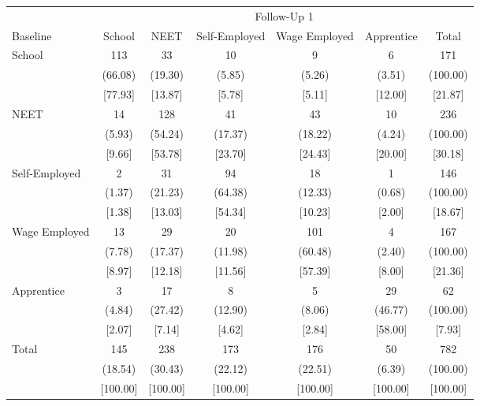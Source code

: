 {
\def\sym#1{\ifmmode^{#1}\else\(^{#1}\)\fi}
\begin{tabular}{l*{6}{c}}
\hline\hline
            &\multicolumn{6}{c}{Follow-Up 1}                                              \\
Baseline    &      School&        NEET&Self-Employed&Wage Employed&  Apprentice&       Total\\
\hline
School      &         113&          33&          10&           9&           6&         171\\
            &     (66.08)&     (19.30)&      (5.85)&      (5.26)&      (3.51)&    (100.00)\\
            &     [77.93]&     [13.87]&      [5.78]&      [5.11]&     [12.00]&     [21.87]\\
NEET        &          14&         128&          41&          43&          10&         236\\
            &      (5.93)&     (54.24)&     (17.37)&     (18.22)&      (4.24)&    (100.00)\\
            &      [9.66]&     [53.78]&     [23.70]&     [24.43]&     [20.00]&     [30.18]\\
Self-Employed&           2&          31&          94&          18&           1&         146\\
            &      (1.37)&     (21.23)&     (64.38)&     (12.33)&      (0.68)&    (100.00)\\
            &      [1.38]&     [13.03]&     [54.34]&     [10.23]&      [2.00]&     [18.67]\\
Wage Employed&          13&          29&          20&         101&           4&         167\\
            &      (7.78)&     (17.37)&     (11.98)&     (60.48)&      (2.40)&    (100.00)\\
            &      [8.97]&     [12.18]&     [11.56]&     [57.39]&      [8.00]&     [21.36]\\
Apprentice  &           3&          17&           8&           5&          29&          62\\
            &      (4.84)&     (27.42)&     (12.90)&      (8.06)&     (46.77)&    (100.00)\\
            &      [2.07]&      [7.14]&      [4.62]&      [2.84]&     [58.00]&      [7.93]\\
Total       &         145&         238&         173&         176&          50&         782\\
            &     (18.54)&     (30.43)&     (22.12)&     (22.51)&      (6.39)&    (100.00)\\
            &    [100.00]&    [100.00]&    [100.00]&    [100.00]&    [100.00]&    [100.00]\\
\hline\hline
\end{tabular}
}
